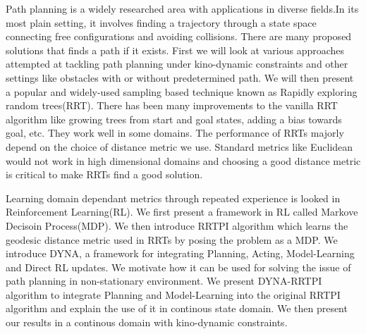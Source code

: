 \documentclass[MTech]{iitmdiss}
\begin{document}
\abstract
Path planning is a widely researched area with applications in diverse fields.In its most plain setting, it involves finding a trajectory through a state space connecting free configurations and avoiding collisions. There are many proposed solutions that finds a path if it exists. First we will look at various approaches attempted at tackling path planning under kino-dynamic constraints and other settings like obstacles with or without predetermined path. We will then present a popular and widely-used sampling based technique known as Rapidly exploring random trees(RRT). There has been many improvements to the vanilla RRT algorithm like growing trees from start and goal states, adding a bias towards goal, etc. They work well in some domains. The performance of RRTs majorly depend on the choice of  distance metric we use. Standard metrics like Euclidean would not work in high dimensional domains and choosing a good distance metric is critical to make RRTs find a good solution. 

Learning domain dependant metrics through repeated experience is looked in Reinforcement Learning(RL). We first present a framework in RL called Markove Decisoin Process(MDP). We then introduce RRTPI algorithm which learns the geodesic distance metric used in RRTs by posing the problem as a MDP. We introduce DYNA, a framework for integrating Planning, Acting, Model-Learning and Direct RL updates. 
We motivate how it can be used for solving the issue of path planning in non-stationary environment. We present DYNA-RRTPI algorithm to integrate Planning and Model-Learning into the original RRTPI algorithm and explain the use of it in continous state domain. We then present our results in a continous domain with kino-dynamic constraints.

\pagebreak


\begin{singlespace}
\tableofcontents
\thispagestyle{empty}

\listoftables
{}
\listoffigures
{}
\end{singlespace}

\pagebreak



%
%
\end{document}
